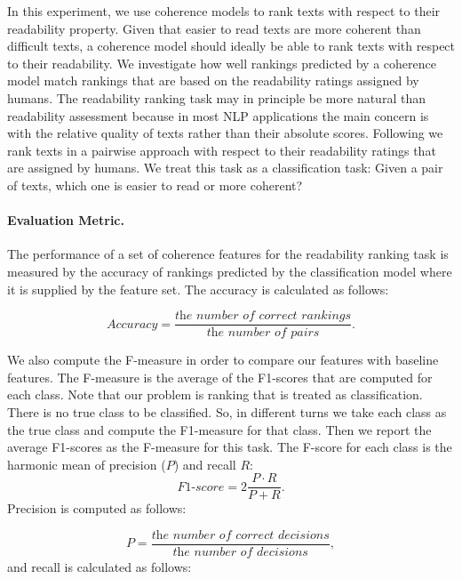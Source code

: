 In this experiment, we use coherence models to rank texts with respect to their readability property. 
Given that easier to read texts are more coherent than difficult texts, a coherence model should ideally be able to rank texts with respect to their readability. 
We investigate how well rankings predicted by a coherence model match rankings that are based on the readability ratings assigned by humans. 
The readability ranking task may in principle be more natural than readability assessment because in most NLP applications the main concern is with the relative quality of texts rather than their absolute scores. 
Following  we rank texts in a pairwise approach with respect to their readability ratings that are assigned by humans. 
We treat this task as a classification task: Given a pair of texts, which one is easier to read or more coherent?

\paragraph{Evaluation Metric.}
The performance of a set of coherence features for the readability ranking task is measured by the accuracy of rankings  predicted by the classification model where it is supplied by the feature set. 
The accuracy is calculated as follows:

\begin{equation}
Accuracy = \frac{\textit{the number of correct rankings}}{\textit{the number of pairs}}. 
\end{equation} 

We also compute the F-measure in order to compare our features with baseline features. 
The F-measure is the average of the F1-scores that are computed for each class. 
Note that our problem is ranking that is treated as classification. 
There is no true class to be classified. 
So, in different turns we take each class as the true class and compute the F1-measure for that class. 
Then we report the average F1-scores as the F-measure for this task. 
The F-score for each class is the harmonic mean of precision ($P$) and recall $R$:
\begin{equation}
\textit{F1-score} = 2\frac{P \cdot R}{P + R}.  
\end{equation}
Precision is computed as follows: 

\begin{equation}
P = \frac{\textit{the number of correct decisions}}{\textit{the number of decisions}},
\end{equation}
and recall is calculated as follows:

